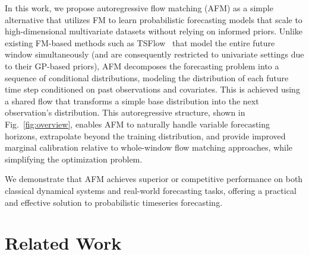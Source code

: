 \documentclass[preprint,12pt,authoryear]{elsarticle}
\newcommand{\oldrev}[1]{#1}
\begin{document}
In this work, we propose autoregressive flow matching (AFM) as a simple alternative that utilizes FM to learn probabilistic forecasting models that scale to high-dimensional multivariate datasets without relying on informed priors. \oldrev{Unlike existing FM-based methods such as TSFlow~\citep{Kerrigan2024Flow} that model the entire future window simultaneously (and are consequently restricted to univariate settings due to their GP-based priors),}
\oldrev{AFM} decomposes the forecasting problem into a sequence of conditional distributions, modeling the distribution of each future time step conditioned on past observations and covariates. This is achieved using a shared flow that transforms a simple base distribution into the next observation’s distribution. This autoregressive structure, shown in Fig.~\ref{fig:overview}, enables AFM to naturally handle variable forecasting horizons, extrapolate beyond the training distribution, and provide \oldrev{improved marginal calibration relative to whole-window flow matching approaches}, while simplifying the optimization problem. 

We demonstrate that AFM achieves superior or competitive performance on both classical dynamical systems and real-world forecasting tasks, offering a practical and effective solution to probabilistic timeseries forecasting.



\section{Related Work}
\label{sec:related_work}
\end{document}
